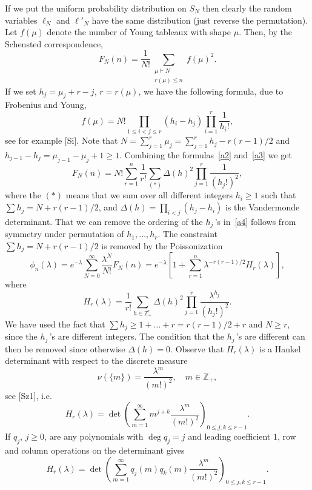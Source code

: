 \documentclass{amsart}
\theoremstyle{definition}
\theoremstyle{remark}
\numberwithin{equation}{section}
\begin{document}
If we put the uniform probability distribution on $S_N$ then clearly
the random variables $\ell_N$ and $\ell'_N$ have the same distribution
(just reverse the permutation). Let $f(\mu)$ denote the number of Young 
tableaux with shape $\mu$. Then, by the Schensted correspondence,
\begin{equation}\label{a2}
F_N(n)=\frac 1{N!}\sum_{\substack{\mu\vdash N \\ r(\mu)\le n}} f(\mu)^2.
\end{equation}
If we set $h_j=\mu_j+r-j$, $r=r(\mu)$, we have the following formula,
due to Frobenius and Young,
\begin{equation}\label{a3}
f(\mu)=N!\prod_{1\le i<j\le r} (h_i-h_j)\prod_{i=1}^r\frac 1{h_i!},
\end{equation}
see for example [Si]. Note that $N=\sum_{j=1}^r\mu_j=\sum_{j=1}^rh_j-r(r-1)/2$
and $h_{j-1}-h_j=\mu_{j-1}-\mu_j+1\ge 1$. Combining the formulas~\eqref{a2} 
and~\eqref{a3} we get
\begin{equation}\label{a4}
F_N(n)=N!\sum_{r=1}^n\frac 1{r!}
\sum_{(\ast)}\Delta(h)^2\prod_{j=1}^r\frac 1{(h_j!)^2},
\end{equation}
where the $(\ast)$ means that we sum over all different integers $h_i\ge 1$ 
such that $\sum h_j=N+r(r-1)/2$, and $\Delta(h)=\prod_{i<j}(h_j-h_i)$ is the
Vandermonde determinant. That we can remove the ordering of the
$h_j\,$'s in~\eqref{a4} follows from symmetry under
permutation of $h_1,\dots,h_r$. The constraint $\sum h_j=N+r(r-1)/2$ is
removed by the Poissonization
\begin{equation}\label{a5}
\phi_n(\lambda)=e^{-\lambda}\sum_{N=0}^\infty\frac{\lambda^N}{N!}F_N(n)=
e^{-\lambda}[1+\sum_{r=1}^n\lambda^{-r(r-1)/2}H_r(\lambda)],
\end{equation}
where
$$
H_r(\lambda)=\frac 1{r!}\sum_{h\in \mathbb Z_+^r}\Delta(h)^2\prod_{j=1}^r
\frac{\lambda^{h_j}}{(h_j!)^2}.
$$
We have used the fact that $\sum h_j\ge 1+\dots +r=r(r-1)/2+r$ and
$N\ge r$, since the $h_j\,$'s are different integers. The condition that
the $h_j\,$'s are different can then be removed since otherwise $\Delta(h)=0$.
Observe that $H_r(\lambda)$ is a Hankel determinant with respect to the
discrete measure
$$
\nu(\{m\})=\frac{\lambda^m}{(m!)^2},\quad m\in\mathbb Z_+,
$$
see [Sz1], i.e.
$$
H_r(\lambda)=\det(\sum_{m=1}^\infty m^{j+k}\frac{\lambda^m}{(m!)^2})_
{0\le j,k\le r-1}.
$$
If $q_j$, $j\ge 0$, are any polynomials with $\deg q_j=j$ and leading 
coefficient $1$, row and column operations on the determinant gives
\begin{equation}\label{a6}
H_r(\lambda)=\det(\sum_{m=1}^\infty q_j(m)q_k(m)\frac{\lambda^m}{(m!)^2})_
{0\le j,k\le r-1}.
\end{equation}
\end{document}
